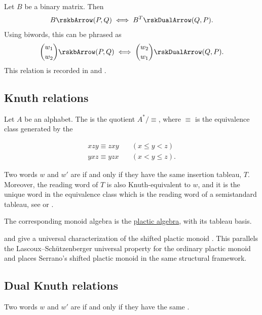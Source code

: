 \begin{proposition}
Let $B$ be a binary matrix.
Then
\[
B \rskbArrow (P,Q) \iff B^T \rskDualArrow (Q,P).
\]
Using biwords, this can be phrased as
\[
\binom{w_1}{w_2} \rskbArrow (P,Q) \iff \binom{w_2}{w_1} \rskDualArrow (Q,P).
\]
This relation is recorded in \cite{Krattenthaler2006} and
\cite[p.~200]{Fulton1997}.
\end{proposition}



\subsection[knuthRelations]{Knuth relations}

Let $A$ be an alphabet. The \label{placticMonoid} is the
quotient $A^*/\equiv$,
where $\equiv$ is the equivalence class generated by the 

\begin{align*}
 xzy \equiv zxy &\quad (x\leq y \lt z) \\
 yxz \equiv yzx &\quad (x\lt y \leq z).
\end{align*}

Two words $w$ and $w'$ are 
if and only if they have the same insertion tableau, $T$.
Moreover, the reading word of $T$ is also Knuth-equivalent to $w$,
and it is the unique word in the equivalence class which is the
reading word of a semistandard tableau,
see \cite[p.~22]{Fulton1997} or \cite[Cor.~2.3.21]{Butler1994}.

The corresponding monoid algebra is the
\hyperref[placticAlgebra]{plactic algebra}, with its tableau basis.

 and  give a
universal characterization of the shifted plactic monoid
\cite{EstupinanSalamancaPechenik2024x}.  This parallels the
Lascoux--Schützenberger universal property for the ordinary plactic monoid and
places Serrano's shifted plactic monoid in the same structural framework.


\subsection[knuthRelationsDual]{Dual Knuth relations}


Two words $w$ and $w'$ are
\label{dualKnuthEquivalent}
if and only if they have the same .

